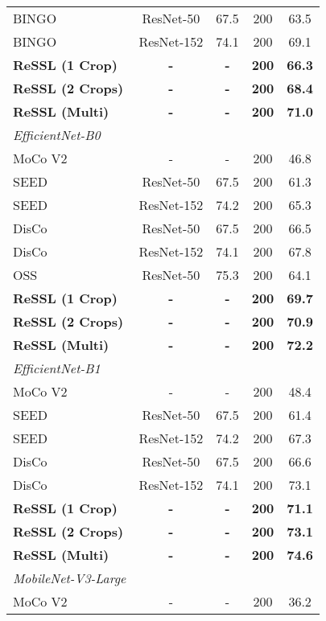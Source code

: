 \documentclass{article}
\newcommand{\<}{\left\langle}
\renewcommand{\>}{\right\rangle}
\begin{document}
\begin{table}[h]
\begin{tabular}{l c c c c}
BINGO \cite{bingo} & ResNet-50 & 67.5 & 200 & 63.5 \\
BINGO \cite{bingo} & ResNet-152 & 74.1 & 200 & 69.1 \\ 
\textbf{ReSSL (1 Crop)}  & \textbf{-} & \textbf{-} & \textbf{200} & \textbf{66.3} \\ 
\textbf{ReSSL (2 Crops)} & \textbf{-} & \textbf{-} & \textbf{200} & \textbf{68.4} \\ 
\textbf{ReSSL (Multi)}   & \textbf{-} & \textbf{-} & \textbf{200} & \textbf{71.0} \\ 
\bottomrule
\emph{EfficientNet-B0} \\
MoCo V2 \cite{mocov2} & - & - & 200 & 46.8 \\
SEED \cite{seed} & ResNet-50 & 67.5 & 200 & 61.3 \\
SEED \cite{seed} & ResNet-152 & 74.2 & 200 & 65.3 \\
DisCo \cite{disco} & ResNet-50 & 67.5 & 200 & 66.5 \\
DisCo \cite{disco} & ResNet-152 & 74.1 & 200 & 67.8 \\
OSS \cite{oss} & ResNet-50 & 75.3 & 200 & 64.1 \\ 
\textbf{ReSSL (1 Crop)}  & \textbf{-} & \textbf{-} & \textbf{200} & \textbf{69.7} \\ 
\textbf{ReSSL (2 Crops)} & \textbf{-} & \textbf{-} & \textbf{200} & \textbf{70.9} \\ 
\textbf{ReSSL (Multi)}   & \textbf{-} & \textbf{-} & \textbf{200} & \textbf{72.2} \\ 
\bottomrule
\emph{EfficientNet-B1} \\
MoCo V2 \cite{mocov2} & - & - & 200 & 48.4 \\
SEED \cite{seed} & ResNet-50 & 67.5 & 200 & 61.4 \\
SEED \cite{seed} & ResNet-152 & 74.2 & 200 & 67.3 \\
DisCo \cite{disco} & ResNet-50 & 67.5 & 200 & 66.6 \\
DisCo \cite{disco} & ResNet-152 & 74.1 & 200 & 73.1 \\ 
\textbf{ReSSL (1 Crop)}  & \textbf{-} & \textbf{-} & \textbf{200} & \textbf{71.1} \\ 
\textbf{ReSSL (2 Crops)} & \textbf{-} & \textbf{-} & \textbf{200} & \textbf{73.1} \\ 
\textbf{ReSSL (Multi)}   & \textbf{-} & \textbf{-} & \textbf{200} & \textbf{74.6} \\ 
\bottomrule
\emph{MobileNet-V3-Large} \\
MoCo V2 \cite{mocov2} & - & - & 200 & 36.2 \\

\end{tabular}
\end{table}
\end{document}
